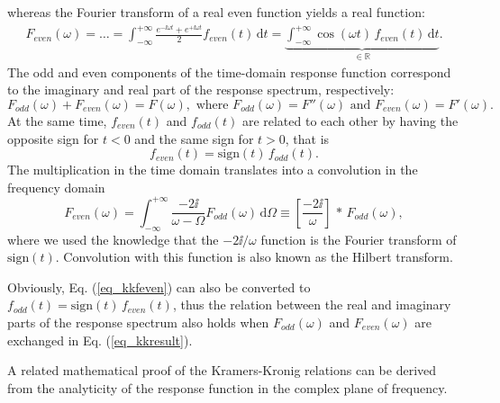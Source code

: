 whereas the Fourier transform of a real even function yields a real function:
\begin{equation} 
\begin{split} 
F_{even}(\omega)= \ldots =   \int_{-\infty}^{+\infty} \frac{e^{-\ii \omega t}+e^{+\ii \omega t}}{2} f_{even}(t) \,\mbox{d}t 
		 = \underbrace{\int_{-\infty}^{+\infty} \cos(\omega t) \, f_{even}(t) \,\mbox{d}t}_{\mbox{$\in \mathbb{R}$}}.
\end{split} 
\label{eq_kkFeven}\end{equation}
The odd and even components of the time-domain response function correspond to the imaginary and real part of the response spectrum, respectively:
\begin{equation} F_{odd}(\omega) + F_{even}(\omega) = F(\omega), \text{ where } F_{odd}(\omega) = F''(\omega) \text{ and } F_{even}(\omega) = F'(\omega).  \label{eq_kkFodd}\end{equation}
At the same time, $f_{even}(t)$ and $f_{odd}(t)$ are related to each other by having the opposite sign for $t<0$ and the same sign for $t>0$, that is 
\begin{equation} f_{even}(t) = \mbox{sign}(t)\,f_{odd}(t). \label{eq_kkfeven}\end{equation}
The multiplication in the time domain translates into a convolution in the frequency domain
\begin{equation} 
F_{even}(\omega) = \int_{-\infty}^{+\infty}  \frac{-2\ii}{\omega - \Omega} F_{odd}(\omega) \,\mbox{d}\Omega  \equiv  \left[\frac{-2\ii}{\omega}\right]\,\ast\,F_{odd}(\omega),
\label{eq_kkresult}\end{equation} 
where we used the knowledge that the $-2\ii/\omega$ function is the Fourier transform of $\mbox{sign}(t)$. Convolution with this function is also known as the Hilbert transform. %

Obviously, Eq. (\ref{eq_kkfeven}) can also be converted to $f_{odd}(t) = \mbox{sign}(t)\,f_{even}(t)$, thus the relation between the real and imaginary parts of the response spectrum also holds when $F_{odd}(\omega)$ and $F_{even}(\omega)$ are exchanged in Eq. (\ref{eq_kkresult}). 

A related mathematical proof of the Kramers-Kronig relations can be derived from the analyticity of the response function in the complex plane of frequency. \cite[p. 125]{klingshirn2007semiconductor}


